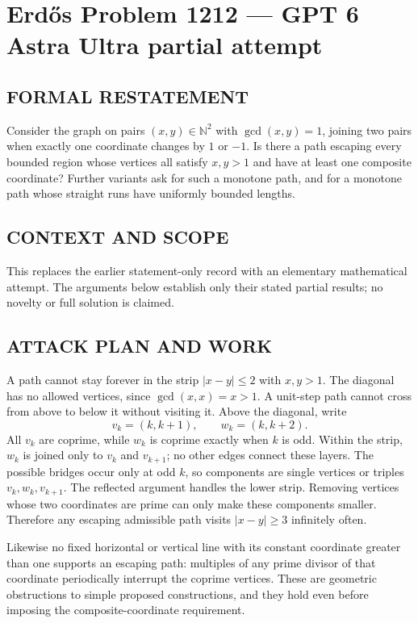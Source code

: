 \section*{Erd\H{o}s Problem 1212 --- GPT 6 Astra Ultra partial attempt}


\subsection*{FORMAL RESTATEMENT}
Consider the graph on pairs $(x,y)\in\mathbb N^2$ with $\gcd(x,y)=1$, joining two pairs when exactly one coordinate changes by $1$ or $-1$. Is there a path escaping every bounded region whose vertices all satisfy $x,y>1$ and have at least one composite coordinate? Further variants ask for such a monotone path, and for a monotone path whose straight runs have uniformly bounded lengths.

\subsection*{CONTEXT AND SCOPE}
This replaces the earlier statement-only record with an elementary mathematical attempt. The arguments below establish only their stated partial results; no novelty or full solution is claimed.

\subsection*{ATTACK PLAN AND WORK}
A path cannot stay forever in the strip $|x-y|\le2$ with $x,y>1$.
The diagonal has no allowed vertices, since $\gcd(x,x)=x>1$.
A unit-step path cannot cross from above to below it without visiting it.
Above the diagonal, write
\[v_k=(k,k+1),\qquad w_k=(k,k+2).\]
All $v_k$ are coprime, while $w_k$ is coprime exactly when $k$ is odd.
Within the strip, $w_k$ is joined only to $v_k$ and $v_{k+1}$; no other
edges connect these layers. The possible bridges occur only at odd $k$,
so components are single vertices or triples
$v_k,w_k,v_{k+1}$. The reflected argument handles the lower strip.
Removing vertices whose two coordinates are prime can only make these
components smaller. Therefore any escaping admissible path visits
$|x-y|\ge3$ infinitely often.

Likewise no fixed horizontal or vertical line with its constant coordinate
greater than one supports an escaping path: multiples of any prime divisor
of that coordinate periodically interrupt the coprime vertices.
These are geometric obstructions to simple proposed constructions, and they
hold even before imposing the composite-coordinate requirement.

